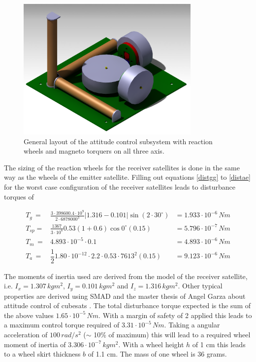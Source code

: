 \begin{figure} [h]
\centering
\includegraphics[width=0.8\textwidth]{chapters/img/AC_setup.png}
\caption[General layout of the attitude control subsystem]{General layout of the attitude control subsystem with reaction wheels and magneto torquers on all three axis.}
\label{fig:catacs}
\end{figure}

The sizing of the reaction wheels for the receiver satellites is done in the same way as the wheels of the emitter satellite. Filling out equations \ref{distgg} to \ref{distae} for the worst case configuration of the receiver satellites leads to disturbance torques of 

\begin{eqnarray*}
T_g \,=& \frac{3\cdot 398600.4\cdot 10^9}{2\cdot 6878000^3} \left| 1.316 - 0.101 \right| \sin{\left(2\cdot 30^\circ \right)} &= 1.933\cdot 10^{-6}\,Nm\\
T_{sp} =& \frac{1367}{3\cdot 10^8}0.53\left(1+0.6\right)\cos{0^\circ}\left(0.15\right) &= 5.796 \cdot 10^{-7}\,Nm\\
T_m \,=& 4.893\cdot 10^{-5} \cdot 0.1  &= 4.893 \cdot 10^{-6}\,Nm\\
T_a \,=& \dfrac{1}{2} 1.80 \cdot 10^{-12}\cdot 2.2\cdot 0.53 \cdot 7613^2 \left(0.15\right) &= 9.123 \cdot 10^{-6}\,Nm
\end{eqnarray*}

The moments of inertia used are derived from the model of the receiver satellite, i.e. $I_x = 1.307\,kgm^2$,  $I_y = 0.101\,kgm^2$ and $I_z = 1.316\,kgm^2$. Other typical properties are derived using SMAD \cite{larson} and the master thesis of Angel Garza about attitude control of cubesats  \cite{wheelmotor}. The total disturbance torque expected is the sum of the above values $1.65 \cdot 10^{-5}\,Nm$. With a margin of safety of 2 applied this leads to a maximum control torque required of $3.31\cdot 10^{-5}\, Nm$. Taking a angular acceleration of $100\,rad/s^2$ ($\sim$ 10\% of maximum) this will lead to a required wheel moment of inertia of $3.306\cdot 10^{-7}\,kgm^2$. With a wheel height $h$ of 1 cm this leads to a wheel skirt thickness $b$ of 1.1 cm. The mass of one wheel is 36 grams.

